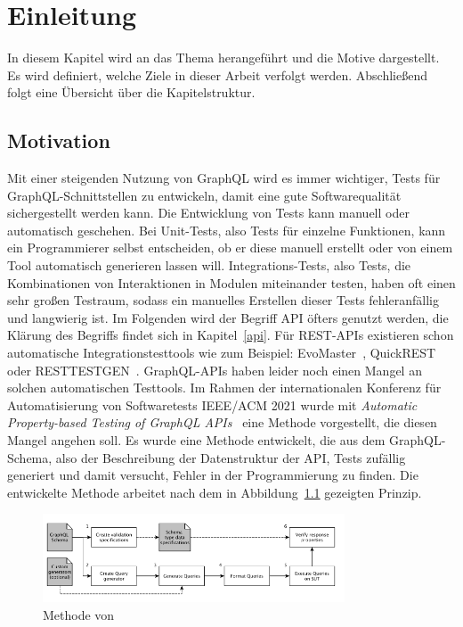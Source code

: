 \chapter{Einleitung}

In diesem Kapitel wird an das Thema herangeführt und die Motive dargestellt.
Es wird definiert, welche Ziele in dieser Arbeit verfolgt werden.
Abschließend folgt eine Übersicht über die Kapitelstruktur.

\section{Motivation}

Mit einer steigenden Nutzung von GraphQL wird es immer wichtiger, Tests für GraphQL-Schnittstellen zu entwickeln, damit eine gute Softwarequalität sichergestellt werden kann.
Die Entwicklung von Tests kann manuell oder automatisch geschehen.
Bei Unit-Tests, also Tests für einzelne Funktionen, kann ein Programmierer selbst entscheiden, ob er diese manuell erstellt
oder von einem Tool automatisch generieren lassen will.
Integrations-Tests, also Tests, die Kombinationen von Interaktionen in Modulen miteinander testen, haben oft
einen sehr großen Testraum, sodass ein manuelles Erstellen dieser Tests fehleranfällig und langwierig ist.
Im Folgenden wird der Begriff API öfters genutzt werden, die Klärung des Begriffs findet sich in Kapitel~\ref{api}.
Für REST-APIs existieren schon automatische Integrationstesttools wie zum Beispiel: EvoMaster~\cite{evo-master}, QuickREST~\cite{karlsson2019quickrest} oder RESTTESTGEN~\cite{rest-test-gen}.
GraphQL-APIs haben leider noch einen Mangel an solchen automatischen Testtools.
Im Rahmen der internationalen  Konferenz für Automatisierung  von  Softwaretests IEEE/ACM 2021 wurde mit
\textit{Automatic Property-based Testing of GraphQL APIs}~\cite{property-based-testing} eine Methode vorgestellt, die diesen Mangel angehen soll.
Es wurde eine Methode entwickelt, die aus dem GraphQL-Schema, also der Beschreibung der Datenstruktur der API, Tests zufällig generiert und damit versucht, Fehler in der Programmierung zu finden.
Die entwickelte Methode arbeitet nach dem in Abbildung~\ref{property-based-method} gezeigten Prinzip.

\begin{figure}[h]
    \centering
    \includegraphics[width=0.8\textwidth,keepaspectratio]{content/einleitung/toolchain}
    \caption{Methode von~\cite{property-based-testing}}
    \label{property-based-method}
\end{figure}
\newpage


